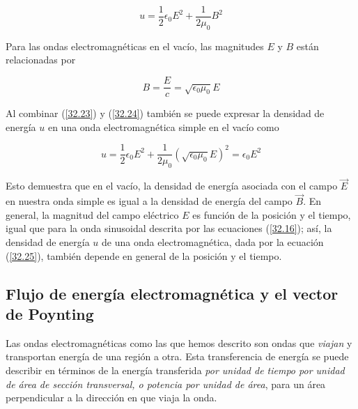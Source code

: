 \begin{equation}\label{32.23}
u=\frac{1}{2}\epsilon_0E^2+\frac{1}{2\mu_0}B^2
\end{equation}

Para las ondas electromagnéticas en el vacío, las magnitudes $E$ y $B$ están relacionadas por

\begin{equation}\label{32.24}
B=\frac{E}{c}=\sqrt{\epsilon_0\mu_0}E
\end{equation}

Al combinar (\ref{32.23}) y (\ref{32.24}) también se puede expresar la densidad de energía $u$ en una onda electromagnética simple en el vacío como

\begin{equation}\label{32.25}
u=\frac{1}{2}\epsilon_0E^2+\frac{1}{2\mu_0}(\sqrt{\epsilon_0\mu_0}E)^2=\epsilon_0E^2
\end{equation}

Esto demuestra que en el vacío, la densidad de energía asociada con el campo $\vec{E}$ en nuestra onda simple es igual a la densidad de energía del campo $\vec{B}$. En general, la magnitud del campo eléctrico $E$ es función de la posición y el tiempo, igual que para la onda sinusoidal descrita por las ecuaciones (\ref{32.16}); así, la densidad de energía $u$ de una onda electromagnética, dada por la ecuación (\ref{32.25}), también depende en general de la posición y el tiempo.

\subsection{Flujo de energía electromagnética y el vector de Poynting}
Las ondas electromagnéticas como las que hemos descrito son ondas que \textit{viajan} y transportan energía de una región a otra. Esta transferencia de energía se puede describir en términos de la energía transferida \textit{por unidad de tiempo por unidad de área de sección transversal, o potencia por unidad de área}, para un área perpendicular a la dirección en que viaja la onda.

